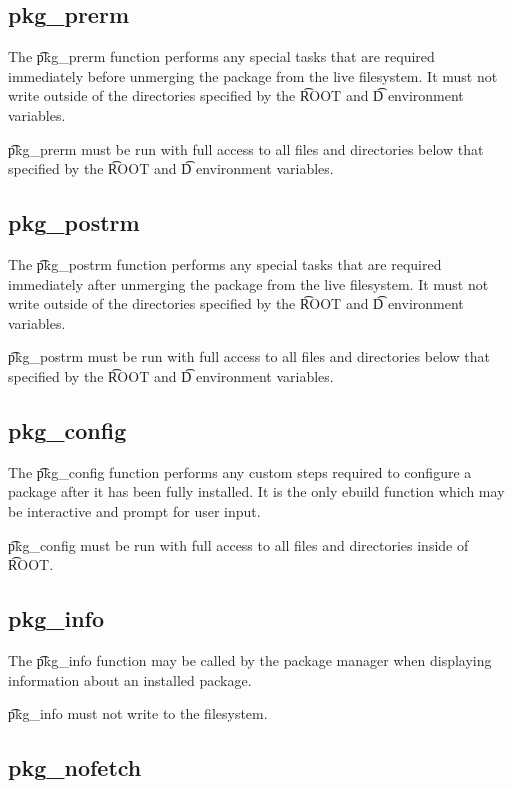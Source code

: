 \subsection{pkg\_prerm}
\label{pkg-prerm-function}

The \t{pkg\_prerm} function performs any special tasks that are required immediately before
unmerging the package from the live filesystem. It must not write outside of the directories specified
by the \t{ROOT} and \t{D} environment variables.

\t{pkg\_prerm} must be run with full access to all files and directories below that specified by
the \t{ROOT} and \t{D} environment variables.

\subsection{pkg\_postrm}
\label{pkg-postrm-function}

The \t{pkg\_postrm} function performs any special tasks that are required immediately after
unmerging the package from the live filesystem. It must not write outside of the directories specified
by the \t{ROOT} and \t{D} environment variables.

\t{pkg\_postrm} must be run with full access to all files and directories below that specified by
the \t{ROOT} and \t{D} environment variables.

\subsection{pkg\_config}
\label{pkg-config-function}

The \t{pkg\_config} function performs any custom steps required to configure a package after it has been
fully installed. It is the only ebuild function which may be interactive and prompt for user input.

\t{pkg\_config} must be run with full access to all files and directories inside of \t{ROOT}.

\subsection{pkg\_info}
\label{pkg-info-function}

The \t{pkg\_info} function may be called by the package manager when displaying information about an
installed package.

\t{pkg\_info} must not write to the filesystem.

\subsection{pkg\_nofetch}
\label{pkg-nofetch-function}

